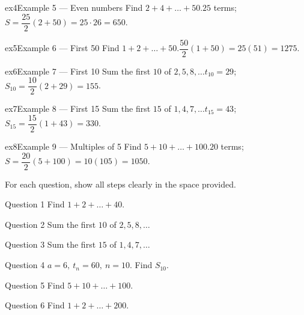 \documentclass[11pt]{article}
\begin{document}
\begin{example}{ex4}{Example 5 --- Even numbers}
Find $2+4+\dots+50$.\soln $25$ terms; $S=\dfrac{25}{2}(2+50)=25\cdot26=650$.
\end{example}

\begin{example}{ex5}{Example 6 --- First 50}
Find $1+2+\dots+50$.\soln $\dfrac{50}{2}(1+50)=25(51)=1275$.
\end{example}

\begin{example}{ex6}{Example 7 --- First 10}
Sum the first $10$ of $2,5,8,\dots$\soln $t_{10}=29$; $S_{10}=\dfrac{10}{2}(2+29)=155$.
\end{example}

\begin{example}{ex7}{Example 8 --- First 15}
Sum the first $15$ of $1,4,7,\dots$\soln $t_{15}=43$; $S_{15}=\dfrac{15}{2}(1+43)=330$.
\end{example}

\begin{example}{ex8}{Example 9 --- Multiples of 5}
Find $5+10+\dots+100$.\soln $20$ terms; $S=\dfrac{20}{2}(5+100)=10(105)=1050$.
\end{example}

\clearpage
{}
For each question, show all steps clearly in the space provided.

\begin{qbox}{Question 1}
Find $1+2+\dots+40$.\workspace{2.4cm}
\end{qbox}

\begin{qbox}{Question 2}
Sum the first $10$ of $2,5,8,\dots$\workspace{2.4cm}
\end{qbox}

\begin{qbox}{Question 3}
Sum the first $15$ of $1,4,7,\dots$\workspace{2.4cm}
\end{qbox}

\begin{qbox}{Question 4}
$a=6,\ t_n=60,\ n=10$. Find $S_{10}$.\workspace{2.4cm}
\end{qbox}

\begin{qbox}{Question 5}
Find $5+10+\dots+100$.\workspace{2.4cm}
\end{qbox}

\begin{qbox}{Question 6}
Find $1+2+\dots+200$.\workspace{2.4cm}
\end{qbox}
\end{document}
